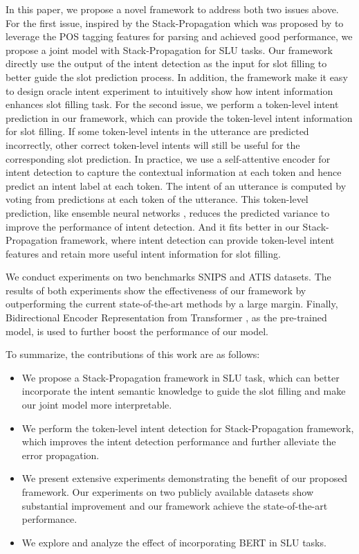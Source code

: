 \documentclass[11pt,a4paper]{article}
\begin{document}
In this paper, we propose a novel framework to address both two issues above.
For the first issue, inspired by the Stack-Propagation which was proposed by  to leverage the POS 
tagging features for parsing and achieved good performance,
we propose a joint model with Stack-Propagation for SLU tasks. Our framework directly use the output of the intent detection as the input for slot filling to better guide the slot prediction process. In addition, the framework make it easy to design oracle intent experiment to intuitively show how intent information enhances slot filling task.
For the second issue, we perform a token-level intent prediction in our framework, which can provide the token-level intent information for slot filling.
If some token-level intents in the utterance are predicted incorrectly, other correct token-level intents will still be useful for the corresponding slot prediction.
In practice,
we use a self-attentive encoder for intent detection to capture the contextual 
information at each token and hence predict an intent label at 
each token.
The intent of an utterance is computed by voting from predictions at each token of the utterance. This token-level prediction, like ensemble neural networks \cite{lee2016stochastic}, reduces the predicted variance to improve the performance of intent detection.
And it fits better in our Stack-Propagation framework, where intent detection
can provide token-level intent features and retain more useful intent information for slot filling. 



We conduct experiments on two benchmarks SNIPS \cite{coucke2018snips} and ATIS \cite{goo2018slot} datasets. The results of both experiments show the effectiveness of our framework by outperforming the current state-of-the-art methods by a large margin. 
Finally, Bidirectional Encoder Representation from Transformer
\cite[BERT]{devlin2018bert}, 
as the pre-trained model, is used to further boost the performance of our model. 

To summarize, the contributions of this work are as follows:
\begin{itemize}
\item We propose a Stack-Propagation framework in SLU task, which
	 can better incorporate the intent semantic knowledge to guide the slot filling and make our joint model more interpretable.

	\item We perform the token-level intent detection for Stack-Propagation framework, which improves the intent detection performance and further alleviate the error propagation. 
	
	\item We present extensive experiments demonstrating the benefit of our proposed framework. Our experiments on two publicly available datasets show substantial improvement and our framework achieve the state-of-the-art performance.
	
	\item  We explore and analyze the effect of incorporating BERT in SLU tasks.
\end{itemize}
\end{document}
